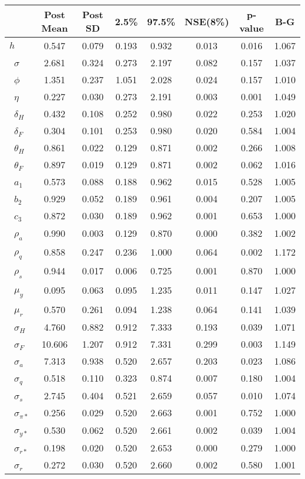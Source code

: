 \begin{tiny}\begin{tabular}{lccccccc}
\hline
&\textbf{Post Mean}&\textbf{Post SD}&\textbf{2.5\%}&\textbf{97.5\%}&\textbf{NSE(8\%)}&\textbf{p-value}&\textbf{B-G}\\\hline
\textbf{$ h             $}&0.547&0.079&0.193&0.932&0.013&0.016&1.067\\\
\textbf{$ \sigma        $}&2.681&0.324&0.273&2.197&0.082&0.157&1.037\\\
\textbf{$ \phi          $}&1.351&0.237&1.051&2.028&0.024&0.157&1.010\\\
\textbf{$ \eta          $}&0.227&0.030&0.273&2.191&0.003&0.001&1.049\\\
\textbf{$ \delta_{H}    $}&0.432&0.108&0.252&0.980&0.022&0.253&1.020\\\
\textbf{$ \delta_{F}    $}&0.304&0.101&0.253&0.980&0.020&0.584&1.004\\\
\textbf{$ \theta_{H}    $}&0.861&0.022&0.129&0.871&0.002&0.266&1.008\\\
\textbf{$ \theta_{F}    $}&0.897&0.019&0.129&0.871&0.002&0.062&1.016\\\
\textbf{$ a_{1}         $}&0.573&0.088&0.188&0.962&0.015&0.528&1.005\\\
\textbf{$ b_{2}         $}&0.929&0.052&0.189&0.961&0.004&0.207&1.005\\\
\textbf{$ c_{3}         $}&0.872&0.030&0.189&0.962&0.001&0.653&1.000\\\
\textbf{$ \rho_{a}      $}&0.990&0.003&0.129&0.870&0.000&0.382&1.002\\\
\textbf{$ \rho_{q}      $}&0.858&0.247&0.236&1.000&0.064&0.002&1.172\\\
\textbf{$ \rho_{s}      $}&0.944&0.017&0.006&0.725&0.001&0.870&1.000\\\
\textbf{$ \mu_{y}       $}&0.095&0.063&0.095&1.235&0.011&0.147&1.027\\\
\textbf{$ \mu_{r}       $}&0.570&0.261&0.094&1.238&0.064&0.141&1.039\\\
\textbf{$ \sigma_{H}    $}&4.760&0.882&0.912&7.333&0.193&0.039&1.071\\\
\textbf{$ \sigma_{F}    $}&10.606&1.207&0.912&7.331&0.299&0.003&1.149\\\
\textbf{$ \sigma_{a}    $}&7.313&0.938&0.520&2.657&0.203&0.023&1.086\\\
\textbf{$ \sigma_{q}    $}&0.518&0.110&0.323&0.874&0.007&0.180&1.004\\\
\textbf{$ \sigma_{s}    $}&2.745&0.404&0.521&2.659&0.057&0.010&1.074\\\
\textbf{$ \sigma_{\pi*} $}&0.256&0.029&0.520&2.663&0.001&0.752&1.000\\\
\textbf{$ \sigma_{y*}   $}&0.530&0.062&0.520&2.661&0.002&0.039&1.004\\\
\textbf{$ \sigma_{r*}   $}&0.198&0.020&0.520&2.653&0.000&0.279&1.000\\\
\textbf{$ \sigma_{r}    $}&0.272&0.030&0.520&2.660&0.002&0.580&1.001\\\hline
\end{tabular}
\end{tiny}